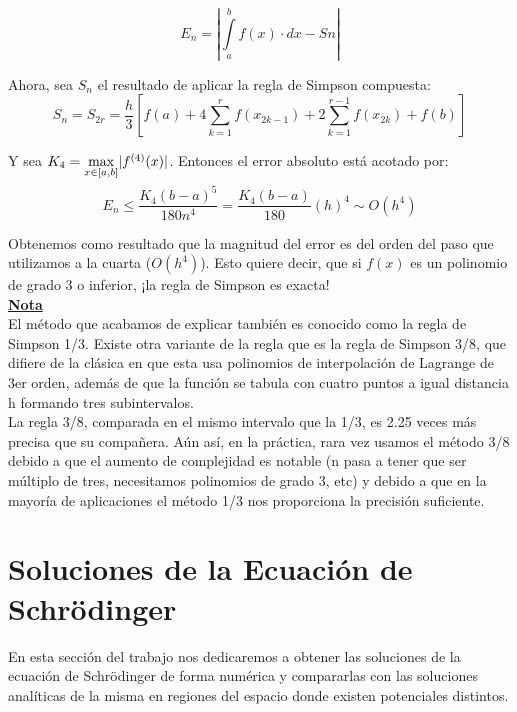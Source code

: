 \documentclass[12pt]{article}
\begin{document}
\begin{equation}
E_n=\left |\displaystyle \int \limits_{a}^{b} f(x) \cdot dx - Sn\right |
\end{equation}

Ahora, sea $S_n$ el resultado de aplicar la regla de Simpson compuesta:
\begin{equation}
S_n = S_{2r} = \frac{h}{3}
[f(a)+4\sum_{k=1}^{r}f(x_{2k-1})+2\sum_{k=1}^{r-1}f(x_{2k})+f(b)]
\end{equation}

Y sea $K_4 = \smash{\displaystyle\max_{x \in [a,b]}} |f^{(4)}(x)|$. Entonces el error absoluto está acotado por:

\begin{equation}
E_n \leq \frac{K_4(b-a)^5}{180n^4} = \frac{K_4(b-a)}{180}(h)^4 \sim O(h^4)
\end{equation}

Obtenemos como resultado que la magnitud del error es del orden del paso que utilizamos a la cuarta ($O(h^4)$). Esto quiere decir, que si $f(x)$ es un polinomio de grado 3 o inferior, ¡la regla de Simpson es exacta!\\

\underline{\textbf{Nota}} \\

El método que acabamos de explicar también es conocido como la regla de Simpson 1/3. Existe otra variante de la regla que es la regla de Simpson 3/8, que difiere de la clásica en que esta usa polinomios de interpolación de Lagrange de 3er orden, además de que la función se tabula con cuatro puntos a igual distancia h formando tres subintervalos. \\

La regla 3/8, comparada en el mismo intervalo que la 1/3, es 2.25 veces más precisa que su compañera. Aún así, en la práctica, rara vez usamos el método 3/8 debido a que el aumento de complejidad es notable (n pasa a tener que ser múltiplo de tres, necesitamos polinomios de grado 3, etc) y debido a que en la mayoría de aplicaciones el método 1/3 nos proporciona la precisión suficiente.\\ 

\newpage
\section{Soluciones de la Ecuación de Schrödinger}
En esta sección del trabajo nos dedicaremos a obtener las soluciones de la ecuación de Schrödinger de forma numérica y compararlas con las soluciones analíticas de la misma en regiones del espacio donde existen potenciales distintos.
\end{document}
